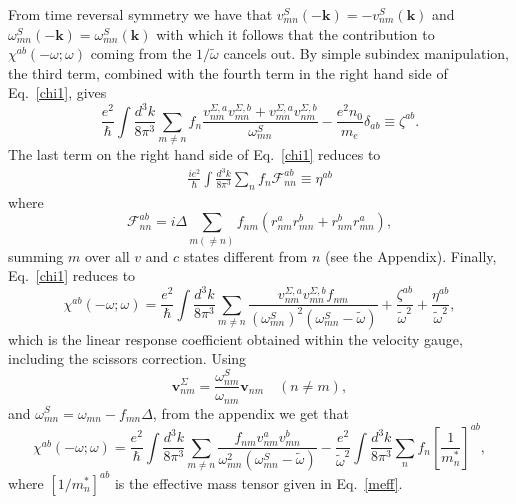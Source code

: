 \documentclass[floatfix,prb,aps,superscriptaddress,11pt]{revtex4}
\begin{document}
From time reversal symmetry we have that
$v_{mn}^{S}(-\mathbf{k})=-v_{nm}^{S}(\mathbf{k})$
and $\omega_{mn}^{S}(-\mathbf{k})=\omega_{mn}^{S}(\mathbf{k})$ with
which it follows
that the contribution to $\chi^{ab}(-\omega;\omega)$ coming
from the $1/\tilde\omega$ cancels out.
By simple subindex manipulation, the third term, combined with the fourth
term in the right hand side of Eq.~\eqref{chi1}, gives 
\begin{equation}
\label{trd2}
\frac{e^{2}}{\hbar }\int \frac{d^{3}k}{8\pi ^{3}}
\sum_{m\ne n}f_n\frac{v_{nm}^{\Sigma ,a}v_{mn}^{\Sigma ,b}+v_{mn}^{\Sigma
,a}v_{nm}^{\Sigma ,b}}{\omega_{mn}^{S}}-\frac{e^{2}n_0}{m_e}\delta_{ab}
\equiv 
\zeta ^{ab}.
\end{equation}
The last term on the right hand side of Eq.~\eqref{chi1} reduces to 
\begin{eqnarray}\label{eta}
\frac{ie^{2}}{\hbar}\int \frac{d^{3}k}{8\pi ^{3}}\sum_{n}f_{n}
\mathcal{F}_{nn}^{ab}  
\equiv \eta ^{ab}
\end{eqnarray}
where
\begin{equation}
\mathcal{F}_{nn}^{ab}=i\Delta\sum_{m(\neq n)}f_{nm }(r_{nm }^{a}r_{mn}^{b}+r_{nm}^{b}r_{mn}^{a}),  \label{calfnn}
\end{equation}
summing $m$ over all $v$ and $c$ states different from $n$ (see the Appendix). 
Finally, Eq.~\eqref{chi1} reduces to 
\begin{equation}
\label{chi2}
\chi ^{ab}(-\omega;\omega)=\frac{e^{2}}{\hbar }\int \frac{d^{3}k}{8\pi ^{3}}
\sum_{m\ne n}\frac{v_{nm}^{\Sigma ,a}v_{mn}^{\Sigma ,b}f_{nm}}{(\omega
_{mn}^{S})^{2}(\omega_{mn}^{S}-\tilde\omega)}
+
\frac{\zeta ^{ab}}{\tilde\omega^{2}}
+
\frac{\eta^{ab}}{\tilde\omega^{2}}
,
\end{equation}
which is the linear response coefficient obtained within
the velocity gauge, including the
scissors correction. 
Using
\begin{equation}
\mathbf{v}_{nm}^{\Sigma}=\frac{\omega_{nm}^{S}}{\omega_{nm}}\mathbf{v}_{nm}\quad (n\neq m),
\label{vsn}
\end{equation}
and $\omega_{mn}^{S}=\omega_{mn}-f_{mn}\Delta$, from the appendix we
get that
\begin{equation}
\chi ^{ab}(-\omega;\omega)=\frac{e^{2}}{\hbar }\int \frac{d^{3}k}{8\pi ^{3}}
\sum_{m\ne n}\frac{f_{nm}v_{nm}^{a}v_{mn}^{b}}{\omega_{mn}^{2}(\omega_{mn}^{S}-\tilde\omega)}-
\frac{e^{2}}{\tilde\omega^{2}}\int \frac{d^{3}k}{8\pi ^{3}}\sum_{n}f_{n}\left[ \frac{
1}{m_{n}^{\ast }}\right] ^{ab},
\label{lastb}
\end{equation}
where $[1/m^*_n]^{ab}$ is the effective mass tensor given in Eq.~\eqref{meff}.
\end{document}
